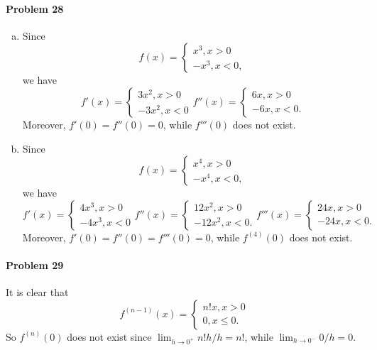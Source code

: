 \documentclass{article}
\begin{document}
\paragraph{Problem 28}
\begin{enumerate}[(a)]
  \item Since \[
      f(x) =
      \begin{cases}
        x^3, x > 0 \\
        -x^3, x < 0,
      \end{cases}
    \] we have \[
      f'(x) =
      \begin{cases}
        3x^2, x > 0 \\
        -3x^2, x < 0
      \end{cases}
      f''(x) =
      \begin{cases}
        6x, x > 0 \\
        -6x, x < 0.
      \end{cases}
    \] Moreover, $f'(0) = f''(0) = 0$, while $f'''(0)$ does not exist.
  \item Since \[
      f(x) =
      \begin{cases}
        x^4, x > 0 \\
        -x^4, x < 0,
      \end{cases}
      \] we have \[
      f'(x) =
      \begin{cases}
        4x^3, x > 0 \\
        -4x^3, x < 0
      \end{cases}
      f''(x) =
      \begin{cases}
        12x^2, x > 0 \\
        -12x^2, x < 0.
      \end{cases}
      f'''(x) =
      \begin{cases}
        24x, x > 0 \\
        -24x, x < 0.
      \end{cases}
    \] Moreover, $f'(0) = f''(0) = f'''(0) = 0$, while $f^{(4)}(0)$ does not
    exist.
\end{enumerate}

\paragraph{Problem 29} It is clear that \[
  f^{(n-1)}(x) =
  \begin{cases}
    n!x, x > 0 \\
    0, x \leq 0.
  \end{cases}
\] So $f^{(n)}(0)$ does not exist since $\lim_{h \to 0^+} n!h/h = n!$, while
$\lim_{h \to 0^-} 0/h = 0$.
\end{document}

